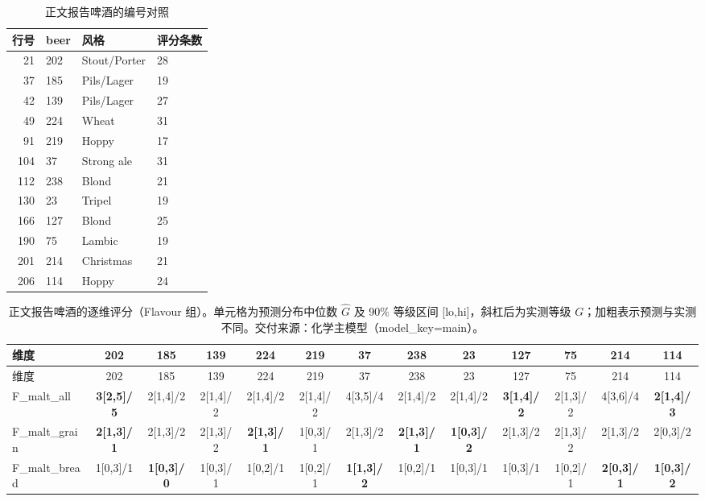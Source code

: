 \begin{landscape}
\scriptsize
\begin{table}[h]
\centering
\caption{正文报告啤酒的编号对照}\label{tab:q1_report_beers_map_flavour}
\begin{tabular}{rlll}
\toprule
行号 & beer & 风格 & 评分条数 \\
\midrule
21 & 202 & Stout/Porter & 28 \\
37 & 185 & Pils/Lager & 19 \\
42 & 139 & Pils/Lager & 27 \\
49 & 224 & Wheat & 31 \\
91 & 219 & Hoppy & 17 \\
104 & 37 & Strong ale & 31 \\
112 & 238 & Blond & 21 \\
130 & 23 & Tripel & 19 \\
166 & 127 & Blond & 25 \\
190 & 75 & Lambic & 19 \\
201 & 214 & Christmas & 21 \\
206 & 114 & Hoppy & 24 \\
\bottomrule
\end{tabular}
\end{table}
\begin{longtable}{lcccccccccccc}
\caption{正文报告啤酒的逐维评分（Flavour 组）。单元格为预测分布中位数 $\hat G$ 及 90\% 等级区间 [lo,hi]，斜杠后为实测等级 $G$；加粗表示预测与实测不同。交付来源：化学主模型（model\_key=main）。}\label{tab:q1_report_beers_flavour}\\
\toprule
维度 & 202 & 185 & 139 & 224 & 219 & 37 & 238 & 23 & 127 & 75 & 214 & 114 \\
\midrule
\endfirsthead
\toprule
维度 & 202 & 185 & 139 & 224 & 219 & 37 & 238 & 23 & 127 & 75 & 214 & 114 \\
\midrule
\endhead
\bottomrule
\endfoot
F\_malt\_all & \textbf{3[2,5]/5} & 2[1,4]/2 & 2[1,4]/2 & 2[1,4]/2 & 2[1,4]/2 & 4[3,5]/4 & 2[1,4]/2 & 2[1,4]/2 & \textbf{3[1,4]/2} & 2[1,3]/2 & 4[3,6]/4 & \textbf{2[1,4]/3} \\
F\_malt\_grain & \textbf{2[1,3]/1} & 2[1,3]/2 & 2[1,3]/2 & \textbf{2[1,3]/1} & 1[0,3]/1 & 2[1,3]/2 & \textbf{2[1,3]/1} & \textbf{1[0,3]/2} & 2[1,3]/2 & 2[1,3]/2 & 2[1,3]/2 & 2[0,3]/2 \\
F\_malt\_bread & 1[0,3]/1 & \textbf{1[0,3]/0} & 1[0,3]/1 & 1[0,2]/1 & 1[0,2]/1 & \textbf{1[1,3]/2} & 1[0,2]/1 & 1[0,3]/1 & 1[0,3]/1 & 1[0,2]/1 & \textbf{2[0,3]/1} & \textbf{1[0,3]/2} \\

\end{longtable}
\end{landscape}

